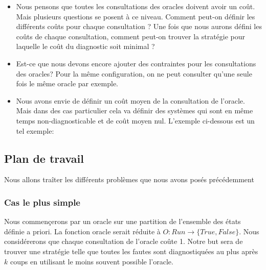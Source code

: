 \documentclass[a4paper,10pt]{article}
\begin{document}
\begin{itemize}
\item Nous pensons que toutes les consultations des oracles doivent avoir un co\^ut. Mais plusieurs questions se posent \`a ce niveau. Comment peut-on d\'efinir les diff\'erents co\^uts pour chaque consultation ? Une fois que nous aurons d\'efini les co\^uts de chaque consultation, comment peut-on trouver la strat\'egie pour laquelle le co\^ut du diagnostic soit minimal ?

\item Est-ce que nous devons encore ajouter des contraintes pour les consultations des oracles? Pour la m\^eme configuration, on ne peut consulter qu'une seule fois le m\^eme oracle par exemple.

\item Nous avons envie de d\'efinir un co\^ut moyen de la consultation de l'oracle. Mais dans des cas particulier cela va d\'efinir des syst\`emes qui sont en m\^eme temps non-diagnosticable et de co\^ut moyen nul. L'exemple ci-dessous est un tel exemple:

\begin{figure}[H]
  \begin{center}
  \end{center}
\end{figure}

  
\end{itemize}


\subsection{Plan de travail}

Nous allons tra\^iter les diff\'erents probl\`emes que nous avons pos\'es pr\'ec\'edemment

\subsubsection{Cas le plus simple}

Nous commen\c cerons par un oracle sur une partition de l'ensemble des états d\'efinie a priori. La fonction oracle serait r\'eduite \`a $O : Run \to \{True, False\}$. Nous consid\'ererons que chaque consultation de l'oracle co\^ute 1. Notre but sera de trouver une strat\'egie telle que toutes les fautes sont diagnostiqu\'ees au plus apr\`es $k$ coups en utilisant le moins souvent possible l'oracle.
\end{document}
